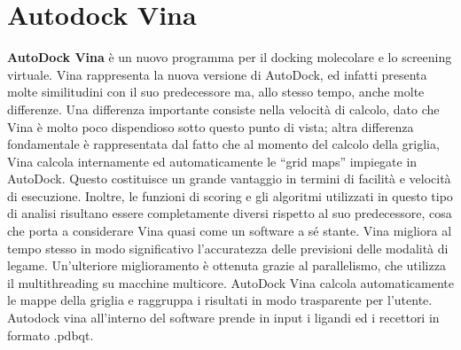 \section{Autodock Vina}
\def\baselinestretch{1.66}
\noindent \textbf{AutoDock Vina} è  un nuovo programma per il docking molecolare e lo screening virtuale. Vina rappresenta la nuova versione di AutoDock, ed infatti presenta molte similitudini con il suo predecessore ma, allo stesso tempo, anche molte differenze. Una differenza importante consiste nella velocità di calcolo, dato che Vina è molto poco dispendioso sotto questo punto di vista; altra differenza fondamentale è rappresentata dal fatto che al momento del calcolo della griglia, Vina calcola internamente ed automaticamente le “grid maps” impiegate in AutoDock. Questo costituisce un grande vantaggio in termini di facilità e velocità di esecuzione. Inoltre, le funzioni di scoring e gli algoritmi utilizzati in questo tipo di analisi risultano essere completamente diversi rispetto al suo predecessore, cosa che porta a considerare Vina quasi come un software a sé stante. Vina migliora al tempo stesso in modo significativo l'accuratezza delle previsioni delle modalità di legame. Un'ulteriore miglioramento è ottenuta grazie al parallelismo, che utilizza il multithreading su macchine multicore. AutoDock Vina calcola automaticamente le mappe della griglia e raggruppa i risultati in modo trasparente per l'utente. Autodock vina all'interno del software prende in input i ligandi ed i recettori in formato .pdbqt.

